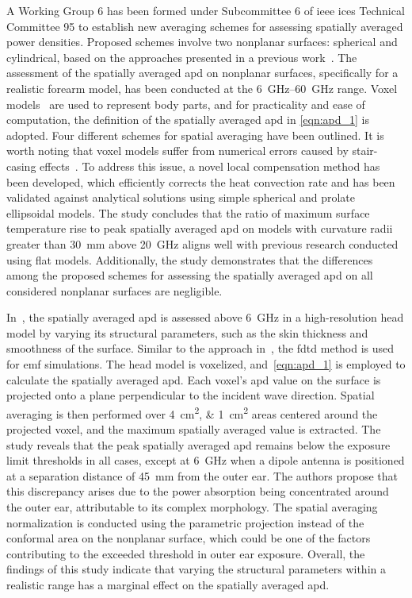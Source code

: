 A Working Group 6 has been formed under Subcommittee 6 of \gls{ieee} \gls{ices} Technical Committee 95 to establish new averaging schemes for assessing spatially averaged power densities.
Proposed schemes involve two nonplanar surfaces: spherical and cylindrical, based on the approaches presented in a previous work~\cite{Diao2020Assessment}.
The assessment of the spatially averaged \gls{apd} on nonplanar surfaces, specifically for a realistic forearm model, has been conducted at the \SIrange{6}{60}{\GHz} range.
Voxel models~\cite{Baek2019FDTD} are used to represent body parts, and for practicality and ease of computation, the definition of the spatially averaged \gls{apd} in \cref{eqn:apd_1} is adopted.
Four different schemes for spatial averaging have been outlined.
It is worth noting that voxel models suffer from numerical errors caused by stair-casing effects~\cite{Baek2019FDTD,Poljak2018conformal}.
To address this issue, a novel local compensation method has been developed, which efficiently corrects the heat convection rate and has been validated against analytical solutions using simple spherical and prolate ellipsoidal models.
The study concludes that the ratio of maximum surface temperature rise to peak spatially averaged \gls{apd} on models with curvature radii greater than \SI{30}{\mm} above \SI{20}{\GHz} aligns well with previous research conducted using flat models.
Additionally, the study demonstrates that the differences among the proposed schemes for assessing the spatially averaged \gls{apd} on all considered nonplanar surfaces are negligible.

In~\cite{Taguchi2022Computation}, the spatially averaged \gls{apd} is assessed above \SI{6}{\GHz} in a high-resolution head model by varying its structural parameters, such as the skin thickness and smoothness of the surface.
Similar to the approach in~\cite{Diao2020Assessment}, the \gls{fdtd} method is used for \gls{emf} simulations.
The head model is voxelized, and~\cref{eqn:apd_1} is employed to calculate the spatially averaged \gls{apd}. 
Each voxel's \gls{apd} value on the surface is projected onto a plane perpendicular to the incident wave direction.
Spatial averaging is then performed over \SIlist{4;1}{\cm\squared} areas centered around the projected voxel, and the maximum spatially averaged value is extracted.
The study reveals that the peak spatially averaged \gls{apd} remains below the exposure limit thresholds in all cases, except at \SI{6}{\GHz} when a dipole antenna is positioned at a separation distance of \SI{45}{\mm} from the outer ear.
The authors propose that this discrepancy arises due to the power absorption being concentrated around the outer ear, attributable to its complex morphology.
The spatial averaging normalization is conducted using the parametric projection instead of the conformal area on the nonplanar surface, which could be one of the factors contributing to the exceeded threshold in outer ear exposure.
Overall, the findings of this study indicate that varying the structural parameters within a realistic range has a marginal effect on the spatially averaged \gls{apd}.

